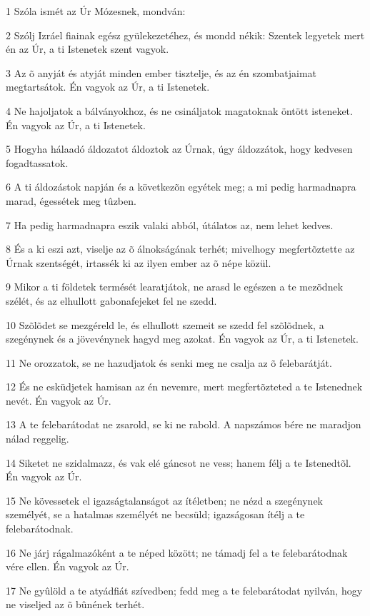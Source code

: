 \par 1 Szóla ismét az Úr Mózesnek, mondván:
\par 2 Szólj Izráel fiainak egész gyülekezetéhez, és mondd nékik: Szentek legyetek mert én az Úr, a ti Istenetek szent vagyok.
\par 3 Az õ anyját és atyját minden ember tisztelje, és az én  szombatjaimat megtartsátok. Én vagyok az Úr, a ti Istenetek.
\par 4 Ne hajoljatok a bálványokhoz, és ne csináljatok magatoknak öntött isteneket. Én vagyok az Úr, a ti Istenetek.
\par 5 Hogyha hálaadó áldozatot áldoztok az Úrnak, úgy áldozzátok, hogy kedvesen fogadtassatok.
\par 6 A ti áldozástok napján és a következõn egyétek meg; a mi pedig harmadnapra marad, égessétek meg tûzben.
\par 7 Ha pedig harmadnapra eszik valaki abból, útálatos az, nem lehet kedves.
\par 8 És a ki eszi azt, viselje az õ álnokságának terhét; mivelhogy megfertõztette az Úrnak szentségét, irtassék ki az ilyen ember az õ népe közül.
\par 9 Mikor a ti földetek termését learatjátok, ne arasd le egészen a te mezõdnek szélét, és az elhullott gabonafejeket fel ne szedd.
\par 10 Szõlõdet se mezgéreld le, és elhullott szemeit se szedd fel szõlõdnek, a szegénynek és a jövevénynek hagyd meg azokat. Én vagyok az Úr, a ti Istenetek.
\par 11 Ne orozzatok, se ne hazudjatok és  senki meg ne csalja az õ felebarátját.
\par 12 És ne esküdjetek hamisan az én nevemre, mert megfertõzteted a te Istenednek nevét. Én vagyok az Úr.
\par 13 A te felebarátodat ne zsarold, se ki ne rabold. A napszámos bére ne maradjon nálad reggelig.
\par 14 Siketet ne szidalmazz, és vak elé gáncsot ne vess; hanem félj a te Istenedtõl. Én vagyok az Úr.
\par 15 Ne kövessetek el igazságtalanságot az ítéletben; ne nézd a szegénynek személyét, se a hatalmas személyét ne becsüld; igazságosan ítélj a te felebarátodnak.
\par 16 Ne járj rágalmazóként a te néped között; ne támadj fel a te felebarátodnak vére ellen. Én vagyok az Úr.
\par 17 Ne gyûlöld a te atyádfiát szívedben; fedd meg  a te felebarátodat nyilván, hogy ne viseljed az õ bûnének terhét.
